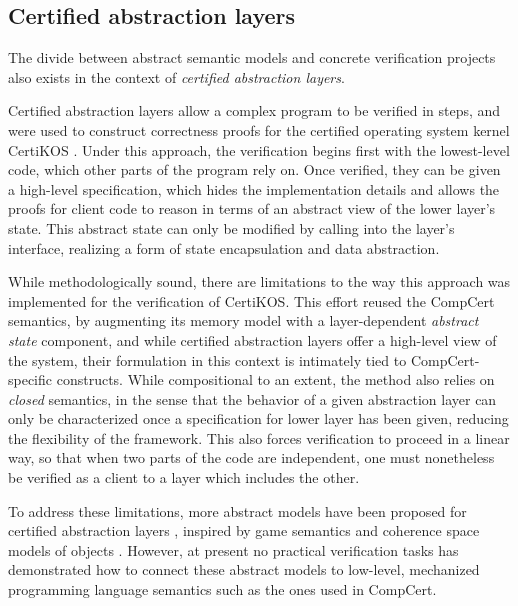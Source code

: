 \documentclass[acmsmall,screen,review,anonymous]{acmart}
\begin{document}
\subsection{Certified abstraction layers}

The divide between abstract semantic models
and concrete verification projects
also exists in the context of \emph{certified abstraction layers}.

Certified abstraction layers
allow a complex program to be verified in steps,
and were used to construct correctness proofs
for the certified operating system kernel CertiKOS
\cite{popl15,ccal}.
Under this approach,
the verification begins first with the lowest-level code,
which other parts of the program rely on.
Once verified,
they can be given a high-level specification,
which hides the implementation details
and allows the proofs for client code
to reason in terms of an abstract view
of the lower layer's state.
This abstract state
can only be modified by calling into
the layer's interface,
realizing a form of state encapsulation
and data abstraction.

While methodologically sound,
there are limitations to the way this approach
was implemented for the verification of CertiKOS.
This effort reused the CompCert semantics,
by augmenting its memory model
with a layer-dependent \emph{abstract state} component,
and while certified abstraction layers
offer a high-level view of the system,
their formulation in this context
is intimately tied to CompCert-specific constructs.
While compositional to an extent,
the method also relies on \emph{closed} semantics,
in the sense that
the behavior of a given abstraction layer
can only be characterized
once a specification for lower layer has been given,
reducing the flexibility of the framework.
This also forces verification to proceed
in a linear way,
so that when two parts of the code
are independent,
one must nonetheless be verified
as a client to a layer which includes the other.

To address these limitations,
more abstract models have been proposed
for certified abstraction layers
\cite{rbgs-cal,popl21},
inspired by game semantics and
coherence space models of objects \cite{objsem}.
However,
at present no practical verification tasks
has demonstrated how to connect these abstract models
to low-level, mechanized programming language semantics
such as the ones used in CompCert.

\end{document}
